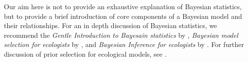 \documentclass{article}
\begin{document}
Our aim here is not to provide an exhaustive explanation of Bayesian statistics, but to provide a brief introduction of core components of a Bayesian model and their relationships. For an in depth discussion of Bayesian statistics, we recommend the \emph{Gentle Introduction to Bayesain statistics} by \cite{van2014gentle}, \emph{Bayesian model selection for ecologists} by \cite{hooten2015guide}, and \emph{Bayesian Inference for ecologists} by \cite{elis2004}. For further discussion of prior selection for ecological models, see \cite{banner2020priors}.
\end{document}
